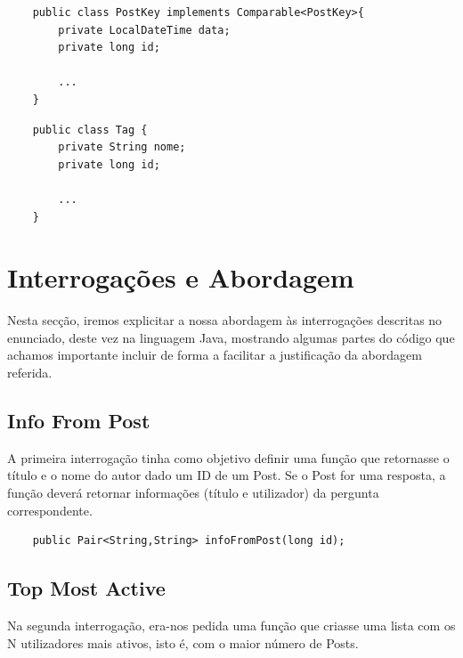 \documentclass[a4paper, 11pt, oneside]{article}
\begin{document}
\begin{lstlisting}
	public class PostKey implements Comparable<PostKey>{
	    private LocalDateTime data;
	    private long id;

	    ...
	}
\end{lstlisting}

\begin{lstlisting}
	public class Tag {
	    private String nome;
	    private long id;

	    ...
	}
\end{lstlisting}





\section{Interrogações e Abordagem}

\label{queries}
Nesta secção, iremos explicitar a nossa abordagem às interrogações descritas no enunciado, deste vez na linguagem Java, mostrando algumas partes do código que 
achamos importante incluir de forma a facilitar a justificação da abordagem referida.



\subsection{Info From Post}

A primeira interrogação tinha como objetivo definir uma função que retornasse o título e o nome do autor dado um ID de um Post. Se o Post for uma resposta, a função 
deverá retornar informações (título e utilizador) da pergunta correspondente.

\begin{lstlisting}
	public Pair<String,String> infoFromPost(long id);
\end{lstlisting}



\subsection{Top Most Active}

Na segunda interrogação, era-nos pedida uma função que criasse uma lista com os N utilizadores mais ativos, isto é, com o maior número de Posts.
\end{document}
